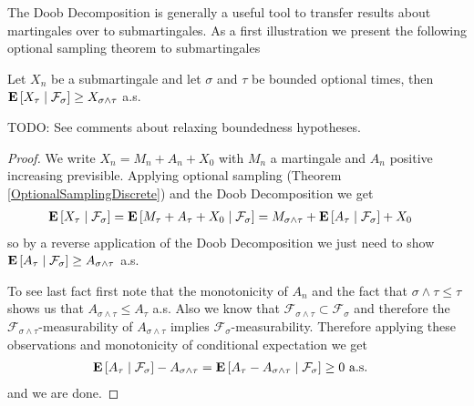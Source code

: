 The Doob Decomposition is generally a useful tool to transfer results
about martingales over to submartingales.  As a first illustration we
present the following optional
sampling theorem to submartingales
\begin{cor}\label{OptionalSamplingSubmartingaleDiscrete}Let $X_n$ be a submartingale and let $\sigma$ and $\tau$ be
  bounded optional times, then
  $\cexpectationlong{\mathcal{F}_\sigma}{X_\tau} \geq X_{\sigma \wedge
    \tau}$ a.s.

TODO: See comments about relaxing boundedness hypotheses.
\end{cor}
\begin{proof}
We write $X_n = M_n + A_n + X_0$ with $M_n$ a martingale and $A_n$ positive
increasing previsible.  Applying optional sampling (Theorem
\ref{OptionalSamplingDiscrete}) and the Doob Decomposition we get
\begin{align*}
\cexpectationlong{\mathcal{F}_\sigma}{X_\tau} &=
\cexpectationlong{\mathcal{F}_\sigma}{M_\tau + A_\tau + X_0} = M_{\sigma
  \wedge \tau} + \cexpectationlong{\mathcal{F}_\sigma}{A_\tau} + X_0
\end{align*}
so by a reverse application of the Doob Decomposition 
we just need to show $\cexpectationlong{\mathcal{F}_\sigma}{A_\tau}
\geq A_{\sigma \wedge \tau}$ a.s.

To see last fact first note that the monotonicity of $A_n$ and the
fact that $\sigma \wedge \tau \leq \tau$ shows us that $A_{\sigma
  \wedge \tau} \leq A_\tau$ a.s.  
Also we know that $\mathcal{F}_{\sigma \wedge
  \tau} \subset \mathcal{F}_\sigma$ and therefore the
$\mathcal{F}_{\sigma \wedge \tau}$-measurability of $A_{\sigma \wedge
  \tau}$ implies $\mathcal{F}_\sigma$-measurability.  Therefore
applying these observations and monotonicity of conditional
expectation we get
\begin{align*}
\cexpectationlong{\mathcal{F}_\sigma}{A_\tau} - A_{\sigma \wedge \tau}
&= \cexpectationlong{\mathcal{F}_\sigma}{A_\tau - A_{\sigma \wedge
    \tau}} \geq 0 \text{ a.s.}
\end{align*}
and we are done.
\end{proof}

